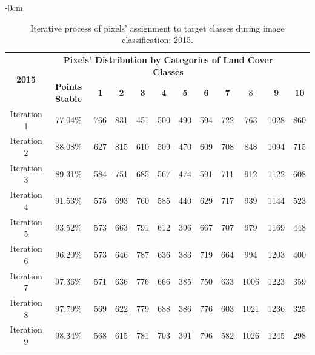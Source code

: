 \documentclass[jmse,article,accept,pdftex,oneauthor]{Definitions/mdpi}
\begin{document}
\begin{table}[H]
\caption{Iterative process of pixels' assignment to target classes during image classification: 2015. \label{tabB2}}
 \setlength{\tabcolsep}{3.8mm}

\begin{adjustwidth}{-\extralength}{0cm}
   \begin{tabular}{cccccccccccc}
  \toprule
  \multirow{2}{*}{\textbf{2015}} & \multicolumn{10}{c}{\textbf{Pixels' Distribution by Categories of Land Cover Classes}} \\
    & \textbf{Points Stable} & \textbf{1} & \textbf{2} &  \textbf{3} & \textbf{4} & \textbf{5} & \textbf{6} & \textbf{7} & 8 & \textbf{9} & \textbf{10} \\
    \midrule
    Iteration 1 & 77.04\% & 766  & 831  &451& 500  &490 &594  &722 &763 &1028 & 860 \\
    Iteration 2 & 88.08\% & 627 & 815 &610 & 509 &470& 609 &708 &848 &1094&715 \\
    Iteration 3 & 89.31\% & 584 & 751& 685 & 567 & 474& 591 &711 &912&1122 &608 \\
    Iteration 4 & 91.53\% & 575  & 693&760&585 & 440& 629 & 717 & 939& 1144 &523 \\
    Iteration 5 & 93.52\% & 573 & 663 & 791 & 612  &396 & 667 & 707 & 979&1169 &448 \\
    Iteration 6 & 96.20\% & 573 & 646 & 787 & 636 &383 &719 &664 &994 & 1203 & 400 \\
    Iteration 7 & 97.36\% & 571 & 636 &776 & 666 &385& 750 & 633  &1006 &1223 &359 \\
    Iteration 8 & 97.79\% & 569 & 622 &779 & 688 &386 &776 &603&1021&1236&325\\
    Iteration 9 & 98.34\% & 568& 615 &781&703  &391&796&582& 1026&1245&298 \\
\bottomrule
\end{tabular}
\end{adjustwidth}
  
  
\end{table}
\unskip
\end{document}
